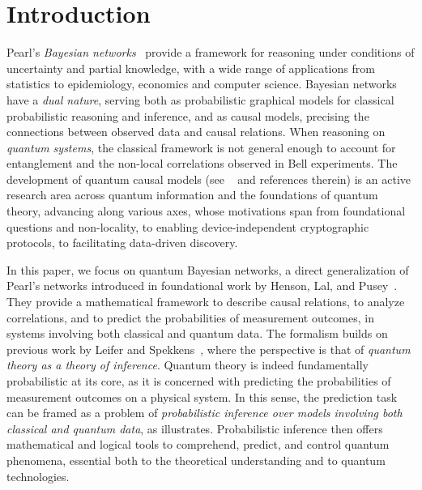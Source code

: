 \section{Introduction}

Pearl's \emph{Bayesian networks}~\cite{Pearl86,Pearl_book} provide a framework for reasoning under conditions of uncertainty and partial knowledge, with a wide range of applications from statistics to epidemiology, economics and computer science.
Bayesian networks have a \emph{dual nature}, serving both as probabilistic graphical models for classical probabilistic reasoning and inference, and as causal models, precising the connections between observed data and causal relations.
When reasoning on \emph{quantum systems}, the classical framework is not general enough to account for entanglement and the non-local correlations observed in Bell experiments.
The development of quantum causal models (see \eg~\cite{BarrettLorenzOreshkov2019} and references therein) is an active research area across quantum information and the foundations of quantum theory, advancing along various axes, whose motivations span from foundational questions and non-locality, to enabling device-independent cryptographic protocols, to facilitating data-driven discovery.

In this paper, we focus on quantum Bayesian networks, a direct generalization of Pearl's networks introduced in foundational work by Henson, Lal, and Pusey~\cite{GBN2014}.
They provide a mathematical framework to describe causal relations, to analyze correlations, and to predict the probabilities of measurement outcomes, in systems involving both classical and quantum data.
The formalism builds on previous work by Leifer and Spekkens~\cite{LeiferSpekkens2013}, where the perspective is that of \emph{quantum theory as a theory of inference}.
Quantum theory is indeed fundamentally probabilistic at its core, as it is concerned with predicting the probabilities of measurement outcomes on a physical system.
In this sense, the prediction task can be framed as a problem of \emph{probabilistic inference over models involving both classical and quantum data}, as  illustrates.
Probabilistic inference then offers mathematical and logical tools to comprehend, predict, and control quantum phenomena, essential both to the theoretical understanding and to quantum technologies.

